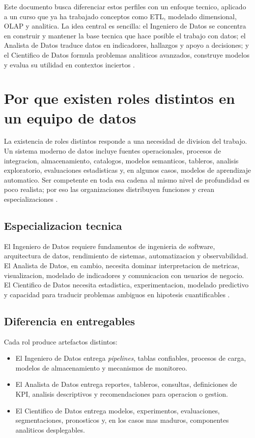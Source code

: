 \documentclass[12pt]{article}
\begin{document}
Este documento busca diferenciar estos perfiles con un enfoque tecnico, aplicado a un curso que ya ha trabajado conceptos como ETL, modelado dimensional, OLAP y analitica. La idea central es sencilla: el Ingeniero de Datos se concentra en construir y mantener la base tecnica que hace posible el trabajo con datos; el Analista de Datos traduce datos en indicadores, hallazgos y apoyo a decisiones; y el Cientifico de Datos formula problemas analiticos avanzados, construye modelos y evalua su utilidad en contextos inciertos \cite{ibm_roles,provost_fawcett}. 

\section{Por que existen roles distintos en un equipo de datos}
La existencia de roles distintos responde a una necesidad de division del trabajo. Un sistema moderno de datos incluye fuentes operacionales, procesos de integracion, almacenamiento, catalogos, modelos semanticos, tableros, analisis exploratorio, evaluaciones estadisticas y, en algunos casos, modelos de aprendizaje automatico. Ser competente en toda esa cadena al mismo nivel de profundidad es poco realista; por eso las organizaciones distribuyen funciones y crean especializaciones \cite{ibm_modern_team,dama_dmbok}.

\subsection{Especializacion tecnica}
El Ingeniero de Datos requiere fundamentos de ingenieria de software, arquitectura de datos, rendimiento de sistemas, automatizacion y observabilidad. El Analista de Datos, en cambio, necesita dominar interpretacion de metricas, visualizacion, modelado de indicadores y comunicacion con usuarios de negocio. El Cientifico de Datos necesita estadistica, experimentacion, modelado predictivo y capacidad para traducir problemas ambiguos en hipotesis cuantificables \cite{ibm_roles,aws_data_science}.

\subsection{Diferencia en entregables}
Cada rol produce artefactos distintos:
\begin{itemize}[leftmargin=*]
\item El Ingeniero de Datos entrega \textit{pipelines}, tablas confiables, procesos de carga, modelos de almacenamiento y mecanismos de monitoreo.
\item El Analista de Datos entrega reportes, tableros, consultas, definiciones de KPI, analisis descriptivos y recomendaciones para operacion o gestion.
\item El Cientifico de Datos entrega modelos, experimentos, evaluaciones, segmentaciones, pronosticos y, en los casos mas maduros, componentes analiticos desplegables.
\end{itemize}
\end{document}

